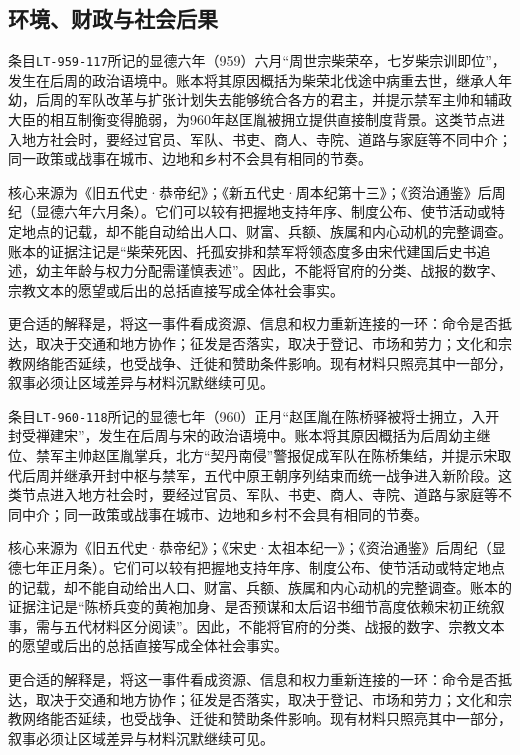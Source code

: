 \subsection{环境、财政与社会后果}

条目\texttt{LT-959-117}所记的显德六年（959）六月“周世宗柴荣卒，七岁柴宗训即位”，发生在后周的政治语境中。账本将其原因概括为柴荣北伐途中病重去世，继承人年幼，后周的军队改革与扩张计划失去能够统合各方的君主，并提示禁军主帅和辅政大臣的相互制衡变得脆弱，为960年赵匡胤被拥立提供直接制度背景。这类节点进入地方社会时，要经过官员、军队、书吏、商人、寺院、道路与家庭等不同中介；同一政策或战事在城市、边地和乡村不会具有相同的节奏。

核心来源为《旧五代史·恭帝纪》；《新五代史·周本纪第十三》；《资治通鉴》后周纪（显德六年六月条）。它们可以较有把握地支持年序、制度公布、使节活动或特定地点的记载，却不能自动给出人口、财富、兵额、族属和内心动机的完整调查。账本的证据注记是“柴荣死因、托孤安排和禁军将领态度多由宋代建国后史书追述，幼主年龄与权力分配需谨慎表述”。因此，不能将官府的分类、战报的数字、宗教文本的愿望或后出的总括直接写成全体社会事实。

更合适的解释是，将这一事件看成资源、信息和权力重新连接的一环：命令是否抵达，取决于交通和地方协作；征发是否落实，取决于登记、市场和劳力；文化和宗教网络能否延续，也受战争、迁徙和赞助条件影响。现有材料只照亮其中一部分，叙事必须让区域差异与材料沉默继续可见。

条目\texttt{LT-960-118}所记的显德七年（960）正月“赵匡胤在陈桥驿被将士拥立，入开封受禅建宋”，发生在后周与宋的政治语境中。账本将其原因概括为后周幼主继位、禁军主帅赵匡胤掌兵，北方“契丹南侵”警报促成军队在陈桥集结，并提示宋取代后周并继承开封中枢与禁军，五代中原王朝序列结束而统一战争进入新阶段。这类节点进入地方社会时，要经过官员、军队、书吏、商人、寺院、道路与家庭等不同中介；同一政策或战事在城市、边地和乡村不会具有相同的节奏。

核心来源为《旧五代史·恭帝纪》；《宋史·太祖本纪一》；《资治通鉴》后周纪（显德七年正月条）。它们可以较有把握地支持年序、制度公布、使节活动或特定地点的记载，却不能自动给出人口、财富、兵额、族属和内心动机的完整调查。账本的证据注记是“陈桥兵变的黄袍加身、是否预谋和太后诏书细节高度依赖宋初正统叙事，需与五代材料区分阅读”。因此，不能将官府的分类、战报的数字、宗教文本的愿望或后出的总括直接写成全体社会事实。

更合适的解释是，将这一事件看成资源、信息和权力重新连接的一环：命令是否抵达，取决于交通和地方协作；征发是否落实，取决于登记、市场和劳力；文化和宗教网络能否延续，也受战争、迁徙和赞助条件影响。现有材料只照亮其中一部分，叙事必须让区域差异与材料沉默继续可见。

